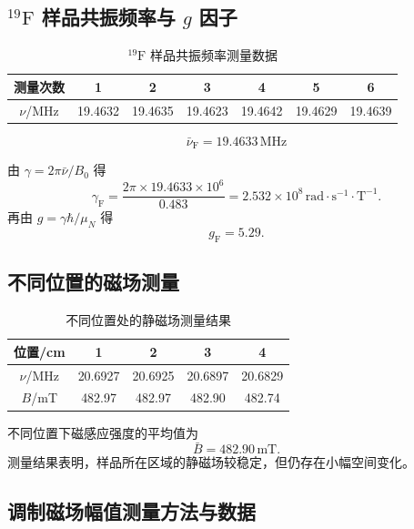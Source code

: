 \documentclass[12pt,a4paper]{article}
\begin{document}
\subsection{$^{19}\mathrm{F}$ 样品共振频率与 $g$ 因子}
\begin{table}[htbp]
\centering
\caption{$^{19}\mathrm{F}$ 样品共振频率测量数据}
\begin{tabular}{ccccccc}
\toprule
测量次数 & 1 & 2 & 3 & 4 & 5 & 6 \\
\midrule
$\nu$/MHz & 19.4632 & 19.4635 & 19.4623 & 19.4642 & 19.4629 & 19.4639 \\
\bottomrule
\end{tabular}
\end{table}

\[
\bar{\nu}_{\mathrm{F}} = 19.4633\,\mathrm{MHz}
\]

由 $\gamma = 2\pi\bar{\nu}/B_0$ 得
\[
\gamma_{\mathrm{F}} = \frac{2\pi\times 19.4633\times 10^6}{0.483}
= 2.532\times 10^8\,\mathrm{rad\cdot s^{-1}\cdot T^{-1}}.
\]
再由 $g = \gamma\hbar/\mu_N$ 得
\[
g_{\mathrm{F}} = 5.29.
\]

\subsection{不同位置的磁场测量}
\begin{table}[htbp]
\centering
\caption{不同位置处的静磁场测量结果}
\begin{tabular}{ccccc}
\toprule
位置/cm & 1 & 2 & 3 & 4 \\
\midrule
$\nu$/MHz & 20.6927 & 20.6925 & 20.6897 & 20.6829 \\
$B$/mT & 482.97 & 482.97 & 482.90 & 482.74 \\
\bottomrule
\end{tabular}
\end{table}

不同位置下磁感应强度的平均值为
\[
\bar{B} = 482.90\,\mathrm{mT}.
\]
测量结果表明，样品所在区域的静磁场较稳定，但仍存在小幅空间变化。

\subsection{调制磁场幅值测量方法与数据}
\end{document}
